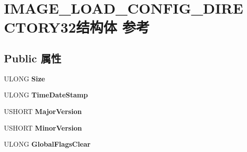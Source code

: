 \hypertarget{struct_i_m_a_g_e___l_o_a_d___c_o_n_f_i_g___d_i_r_e_c_t_o_r_y32}{}\section{I\+M\+A\+G\+E\+\_\+\+L\+O\+A\+D\+\_\+\+C\+O\+N\+F\+I\+G\+\_\+\+D\+I\+R\+E\+C\+T\+O\+R\+Y32结构体 参考}
\label{struct_i_m_a_g_e___l_o_a_d___c_o_n_f_i_g___d_i_r_e_c_t_o_r_y32}
\subsection*{Public 属性}
\begin{DoxyCompactItemize}
\item 
\mbox{\label{struct_i_m_a_g_e___l_o_a_d___c_o_n_f_i_g___d_i_r_e_c_t_o_r_y32_a583bf4ee94c4fa97f3f03265586cf247}} 
U\+L\+O\+NG {\bfseries Size}
\item 
\mbox{\label{struct_i_m_a_g_e___l_o_a_d___c_o_n_f_i_g___d_i_r_e_c_t_o_r_y32_acf5c5c386f530babac66c2f3ae853aaf}} 
U\+L\+O\+NG {\bfseries Time\+Date\+Stamp}
\item 
\mbox{\label{struct_i_m_a_g_e___l_o_a_d___c_o_n_f_i_g___d_i_r_e_c_t_o_r_y32_acca8275fb5731a008abb53eafc4c3505}} 
U\+S\+H\+O\+RT {\bfseries Major\+Version}
\item 
\mbox{\label{struct_i_m_a_g_e___l_o_a_d___c_o_n_f_i_g___d_i_r_e_c_t_o_r_y32_a1a992995a9c0f2c09a9968a2171751c4}} 
U\+S\+H\+O\+RT {\bfseries Minor\+Version}
\item 
\mbox{\label{struct_i_m_a_g_e___l_o_a_d___c_o_n_f_i_g___d_i_r_e_c_t_o_r_y32_a7128b14d5aad4e90554990715a20e9b6}} 
U\+L\+O\+NG {\bfseries Global\+Flags\+Clear}
\item 
\mbox{\label{struct_i_m_a_g_e___l_o_a_d___c_o_n_f_i_g___d_i_r_e_c_t_o_r_y32_aa0f13ebb188a64dd762037b06f38a20a}} 

\end{DoxyCompactItemize}
